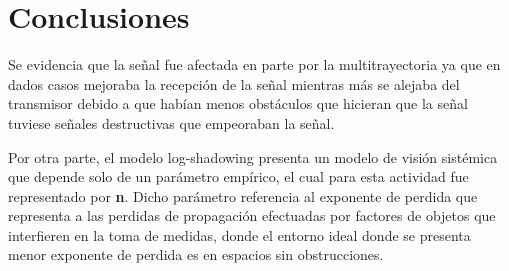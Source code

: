 \section{Conclusiones}\label{sec:conclusiones}
Se evidencia que la señal fue afectada en parte por la multitrayectoria ya que en dados casos mejoraba la recepción de la señal mientras más se alejaba del transmisor debido a que habían menos obstáculos que hicieran que la señal tuviese señales destructivas que empeoraban la señal. 

Por otra parte, el modelo log-shadowing presenta un modelo de visión sistémica que depende solo de un parámetro empírico, el cual para esta actividad fue representado por \textbf{n}. Dicho parámetro referencia al exponente de perdida que representa a las perdidas de propagación efectuadas por factores de objetos que interfieren en la toma de medidas, donde el entorno ideal donde se presenta menor exponente de perdida es en espacios sin obstrucciones.



